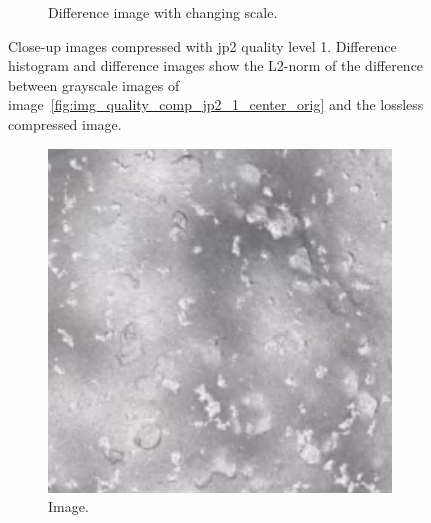 \begin{figure}[htb]
\begin{subfigure}[b]{0.48\textwidth}
        \caption{Difference image with changing scale.}
        \label{fig:img_quality_comp_jp2_1_center_diff_rel}
    \end{subfigure}
    \caption{Close-up images compressed with \gls{jp2} quality level 1. Difference histogram and difference images show the L2-norm of the difference between grayscale images of image~\ref{fig:img_quality_comp_jp2_1_center_orig} and the lossless compressed image.}
    \label{fig:img_quality_comp_jp2_1_center}
\end{figure}

\begin{figure}[htb]
    \centering
    \begin{subfigure}[b]{0.48\textwidth}
        \centering
        \includegraphics[width=\textwidth]{doc/thesis/0_figures/compare_quality/set1/jp2_5_center.png}
        \caption{Image.}
        \label{fig:img_quality_comp_jp2_5_center_orig}
    \end{subfigure}
    \begin{subfigure}[b]{0.48\textwidth}
        \centering

\end{subfigure}
\end{figure}
